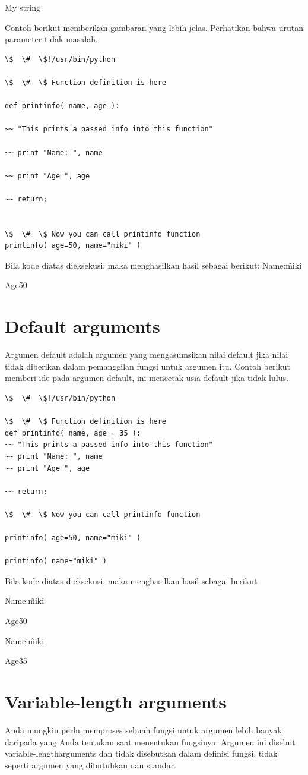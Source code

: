My string 

Contoh berikut memberikan gambaran yang lebih jelas. Perhatikan bahwa urutan parameter tidak masalah. 
\begin{verbatim}
\$  \#  \$!/usr/bin/python 

\$  \#  \$ Function definition is here 

def printinfo( name, age ):

~~ "This prints a passed info into this function"

~~ print "Name: ", name 

~~ print "Age ", age 

~~ return; 


\$  \#  \$ Now you can call printinfo function 
printinfo( age=50, name="miki" )
\end{verbatim}
Bila kode diatas dieksekusi, maka menghasilkan hasil sebagai berikut:
Name:\~ miki

Age\~ 50 


\section{Default arguments} 
Argumen default adalah argumen yang mengasumsikan nilai default jika nilai tidak diberikan dalam pemanggilan fungsi untuk argumen itu. Contoh berikut memberi ide pada argumen default, ini mencetak usia default jika tidak lulus.
\begin{verbatim}
\$  \#  \$!/usr/bin/python

\$  \#  \$ Function definition is here 
def printinfo( name, age = 35 ): 
~~ "This prints a passed info into this function"
~~ print "Name: ", name 
~~ print "Age ", age 

~~ return;

\$  \#  \$ Now you can call printinfo function

printinfo( age=50, name="miki" ) 

printinfo( name="miki" ) 
\end{verbatim}
Bila kode diatas dieksekusi, maka menghasilkan hasil sebagai berikut

Name:\~ miki 

Age\~ 50 

Name:\~ miki

Age\~ 35 

\section{Variable-length arguments} 
Anda mungkin perlu memproses sebuah fungsi untuk argumen lebih banyak daripada yang Anda tentukan saat menentukan fungsinya. Argumen ini disebut variable-lengtharguments dan tidak disebutkan dalam definisi fungsi, tidak seperti argumen yang dibutuhkan dan standar. 

